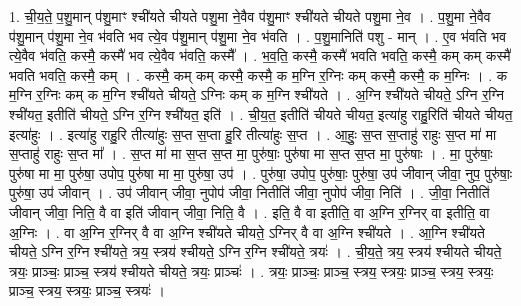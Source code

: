 \documentclass[17pt]{extarticle}
\begin{document}
1. ची॒य॒ते॒ प॒शु॒मान् प॑शु॒माꣳ श्ची॑यते चीयते पशु॒मा ने॒वैव प॑शु॒माꣳ श्ची॑यते चीयते पशु॒मा ने॒व । . प॒शु॒मा ने॒वैव प॑शु॒मान् प॑शु॒मा ने॒व भ॑वति भव त्ये॒व प॑शु॒मान् प॑शु॒मा ने॒व भ॑वति । . प॒शु॒मानिति॑ पशु - मान् । . ए॒व भ॑वति भव त्ये॒वैव भ॑वति॒ कस्मै॒ कस्मै॑ भव त्ये॒वैव भ॑वति॒ कस्मै᳚ । . भ॒व॒ति॒ कस्मै॒ कस्मै॑ भवति भवति॒ कस्मै॒ कम् कम् कस्मै॑ भवति भवति॒ कस्मै॒ कम् । . कस्मै॒ कम् कम् कस्मै॒ कस्मै॒ क म॒ग्नि र॒ग्निः कम् कस्मै॒ कस्मै॒ क म॒ग्निः । . क म॒ग्नि र॒ग्निः कम् क म॒ग्नि श्ची॑यते चीयते॒ ऽग्निः कम् क म॒ग्नि श्ची॑यते । . अ॒ग्नि श्ची॑यते चीयते॒ ऽग्नि र॒ग्नि श्ची॑यत॒ इतीति॑ चीयते॒ ऽग्नि र॒ग्नि श्ची॑यत॒ इति॑ । . ची॒य॒त॒ इतीति॑ चीयते चीयत॒ इत्या॑हु राहु॒रिति॑ चीयते चीयत॒ इत्या॑हुः । . इत्या॑हु राहु॒रि तीत्या॑हुः स॒प्त स॒प्ता हु॒रि तीत्या॑हुः स॒प्त । . आ॒हुः॒ स॒प्त स॒प्ताहु॑ राहुः स॒प्त मा॑ मा स॒प्ताहु॑ राहुः स॒प्त मा᳚ । . स॒प्त मा॑ मा स॒प्त स॒प्त मा॒ पुरु॑षाः॒ पुरु॑षा मा स॒प्त स॒प्त मा॒ पुरु॑षाः । . मा॒ पुरु॑षाः॒ पुरु॑षा मा मा॒ पुरु॑षा॒ उपोप॒ पुरु॑षा मा मा॒ पुरु॑षा॒ उप॑ । . पुरु॑षा॒ उपोप॒ पुरु॑षाः॒ पुरु॑षा॒ उप॑ जीवान् जीवा॒ नुप॒ पुरु॑षाः॒ पुरु॑षा॒ उप॑ जीवान् । . उप॑ जीवान् जीवा॒ नुपोप॑ जीवा॒ नितीति॑ जीवा॒ नुपोप॑ जीवा॒ निति॑ । . जी॒वा॒ नितीति॑ जीवान् जीवा॒ निति॒ वै वा इति॑ जीवान् जीवा॒ निति॒ वै । . इति॒ वै वा इतीति॒ वा अ॒ग्नि र॒ग्निर् वा इतीति॒ वा अ॒ग्निः । . वा अ॒ग्नि र॒ग्निर् वै वा अ॒ग्नि श्ची॑यते चीयते॒ ऽग्निर् वै वा अ॒ग्नि श्ची॑यते । . आ॒ग्नि श्ची॑यते चीयते॒ ऽग्नि र॒ग्नि श्ची॑यते॒ त्रय॒ स्त्रय॑ श्चीयते॒ ऽग्नि र॒ग्नि श्ची॑यते॒ त्रयः॑ । . ची॒य॒ते॒ त्रय॒ स्त्रय॑ श्चीयते चीयते॒ त्रयः॒ प्राञ्चः॒ प्राञ्च॒ स्त्रय॑ श्चीयते चीयते॒ त्रयः॒ प्राञ्चः॑ । . त्रयः॒ प्राञ्चः॒ प्राञ्च॒ स्त्रय॒ स्त्रयः॒ प्राञ्च॒ स्त्रय॒ स्त्रयः॒ प्राञ्च॒ स्त्रय॒ स्त्रयः॒ प्राञ्च॒ स्त्रयः॑ । \newline
\end{document}
